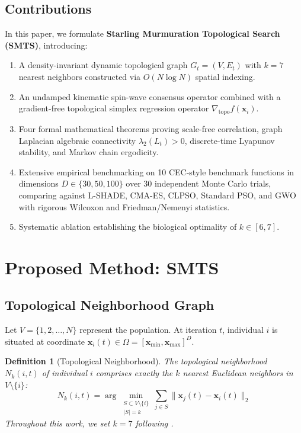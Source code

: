 \documentclass[journal]{IEEEtran}
\newtheorem{definition}{Definition}
\begin{document}
\subsection{Contributions}
In this paper, we formulate \textbf{Starling Murmuration Topological Search (SMTS)}, introducing:
\begin{enumerate}
    \item A density-invariant dynamic topological graph $G_t = (V, E_t)$ with $k=7$ nearest neighbors constructed via $O(N \log N)$ spatial indexing.
    \item An undamped kinematic spin-wave consensus operator combined with a gradient-free topological simplex regression operator $\nabla_{\text{topo}} f(\mathbf{x}_i)$.
    \item Four formal mathematical theorems proving scale-free correlation, graph Laplacian algebraic connectivity $\lambda_2(L_t) > 0$, discrete-time Lyapunov stability, and Markov chain ergodicity.
    \item Extensive empirical benchmarking on 10 CEC-style benchmark functions in dimensions $D \in \{30, 50, 100\}$ over 30 independent Monte Carlo trials, comparing against L-SHADE, CMA-ES, CLPSO, Standard PSO, and GWO with rigorous Wilcoxon and Friedman/Nemenyi statistics.
    \item Systematic ablation establishing the biological optimality of $k \in [6, 7]$.
\end{enumerate}

\section{Proposed Method: SMTS}

\subsection{Topological Neighborhood Graph}
Let $V = \{1, 2, \dots, N\}$ represent the population. At iteration $t$, individual $i$ is situated at coordinate $\mathbf{x}_i(t) \in \Omega = [\mathbf{x}_{\min}, \mathbf{x}_{\max}]^D$.

\begin{definition}[Topological Neighborhood]
The topological neighborhood $N_k(i, t)$ of individual $i$ comprises exactly the $k$ nearest Euclidean neighbors in $V \setminus \{i\}$:
\begin{equation}
N_k(i, t) = \arg\min_{\substack{S \subset V \setminus \{i\} \\ |S| = k}} \sum_{j \in S} \|\mathbf{x}_j(t) - \mathbf{x}_i(t)\|_2
\end{equation}
Throughout this work, we set $k = 7$ following \cite{cavagna2010scale}.
\end{definition}
\end{document}
